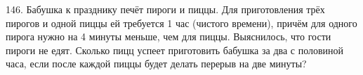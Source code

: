 146. Бабушка к празднику печёт пироги и пиццы. Для приготовления трёх пирогов и одной пиццы ей требуется 1 час (чистого времени), причём для одного пирога нужно на 4 минуты меньше, чем для пиццы. Выяснилось, что гости пироги не едят. Сколько пицц успеет приготовить бабушка за два с половиной часа, если после каждой пиццы будет делать перерыв на две минуты?\\
